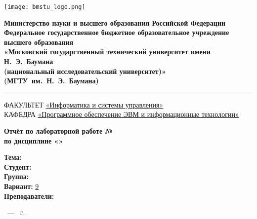 \thispagestyle{empty}

\begin{titlepage}
	\noindent \begin{minipage}{0.1\textwidth}
	\texttt{[image: bmstu\_logo.png]}
	\end{minipage}
	\noindent\begin{minipage}{0.9\textwidth}\centering
		\textbf{Министерство науки и высшего образования Российской Федерации}\\
		\textbf{Федеральное государственное бюджетное образовательное учреждение высшего образования}\\
		\textbf{«Московский государственный технический университет имени Н.~Э.~Баумана}\\
		\textbf{(национальный исследовательский университет)»}\\
		\textbf{(МГТУ~им.~Н.~Э.~Баумана)}
	\end{minipage}
	
	\vspace{7pt}
	
	\noindent\rule{\textwidth}{2pt}
	
	\vspace{7pt}
	
	\noindent ФАКУЛЬТЕТ \underline{«Информатика и системы управления»} \\
	\noindent КАФЕДРА \underline{«Программное обеспечение ЭВМ и информационные технологии»}
	
	\vspace{2.5cm}
	
	\begin{center}
		\Large\textbf{Отчёт по лабораторной работе №\labNumber} \\
		\Large\textbf{по дисциплине «\subjectName»} \\
	\end{center}
	
	\vspace{2.5cm}
	
	\noindent\textbf{Тема:} \underline{\labTheme} \\
	\noindent\textbf{Студент:} \underline{\student} \\
	\noindent\textbf{Группа:} \underline{\group} \\
	\noindent\textbf{Вариант:} \underline{9}\\
	\noindent\textbf{Преподаватели:} \underline{\teachers}\\
	
	\vspace*{\fill}
	
	\begin{center}
	\city~--- \the\year{}~г.	
	\end{center}

\end{titlepage}

\newpage

